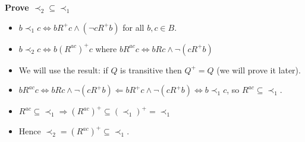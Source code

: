 \documentclass[letterpaper, 8pt]{extarticle}
\begin{document}
\begin{multicols*}{3}
    \textbf{Prove $\prec_2 \subseteq \prec_1$}
    \begin{itemize}
        \item
            $b \prec_1 c \Leftrightarrow bR^+ c \land (\lnot c R^+ b)$ for all $b, c \in B$.
        \item
            $b \prec_2 c \Leftrightarrow b(R^{ac})^+ c$ where $bR^{ac}c \Leftrightarrow bRc \land \lnot (c R^+ b)$
        \item
            We will use the result: if $Q$ is transitive then $Q^+ = Q$ (we will prove it later).
        \item
            $bR^{ac} c \Leftrightarrow bRc \land \lnot (c R^+ b) \Leftarrow bR^+ c \land \lnot (c R^+ b) \Leftrightarrow b \prec_1 c$, so $R^{ac} \subseteq \prec_1$.
        \item
            $R^{ac} \subseteq \prec_1 \Rightarrow (R^{ac})^+ \subseteq (\prec_1)^+ = \prec_1$
        \item
            Hence $\prec_2 = (R^{ac})^+ \subseteq \prec_1$.
    \end{itemize}

\end{multicols*}
\end{document}
